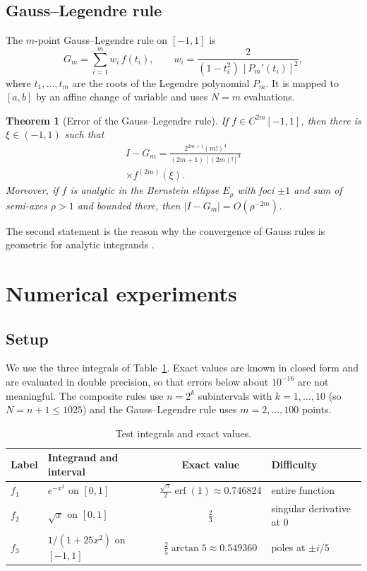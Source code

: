 \documentclass[10pt,twocolumn,a4paper]{article}
\theoremstyle{plain}
\newtheorem{theorem}{Theorem}
\theoremstyle{remark}
\DeclareMathOperator{\erf}{erf}
\begin{document}
\subsection{Gauss--Legendre rule}
The $m$-point Gauss--Legendre rule on $[-1,1]$ is
\begin{equation}
  G_m = \sum_{i=1}^{m} w_i\, f(t_i), \qquad w_i=\frac{2}{(1-t_i^2)\,[P_m'(t_i)]^2},
  \label{eq:gauss}
\end{equation}
where $t_1,\dots,t_m$ are the roots of the Legendre polynomial $P_m$. It is mapped to $[a,b]$ by an affine change of variable and uses $N=m$ evaluations.

\begin{theorem}[Error of the Gauss--Legendre rule]\label{thm:gauss}
If $f\in C^{2m}[-1,1]$, then there is $\xi\in(-1,1)$ such that
\begin{multline}
  I-G_m=\frac{2^{2m+1}(m!)^4}{(2m+1)\,[(2m)!]^3}\\
  \times f^{(2m)}(\xi).
  \label{eq:gauss-err}
\end{multline}
Moreover, if $f$ is analytic in the Bernstein ellipse $E_\rho$ with foci $\pm1$ and sum of semi-axes $\rho>1$ and bounded there, then $|I-G_m|=O(\rho^{-2m})$.
\end{theorem}

The second statement is the reason why the convergence of Gauss rules is geometric for analytic integrands \citep{trefethen2013}.

\section{Numerical experiments}
\subsection{Setup}\label{sec:setup}
We use the three integrals of Table~\ref{tab:tests}. Exact values are known in closed form and are evaluated in double precision, so that errors below about $10^{-16}$ are not meaningful. The composite rules use $n=2^k$ subintervals with $k=1,\dots,10$ (so $N=n+1\le 1025$) and the Gauss--Legendre rule uses $m=2,\dots,100$ points.

\begin{table}[t]
  \centering
  \caption{Test integrals and exact values.}
  \label{tab:tests}
  \begin{tabular}{llcl}
    \toprule
    Label & Integrand and interval & Exact value & Difficulty \\
    \midrule
    $f_1$ & $e^{-x^2}$ on $[0,1]$ & $\tfrac{\sqrt\pi}{2}\erf(1)\approx 0.746824$ & entire function \\
    $f_2$ & $\sqrt{x}$ on $[0,1]$ & $\tfrac23$ & singular derivative at $0$ \\
    $f_3$ & $1/(1+25x^2)$ on $[-1,1]$ & $\tfrac25\arctan 5\approx 0.549360$ & poles at $\pm i/5$ \\
    \bottomrule
  \end{tabular}
\end{table}
\end{document}
